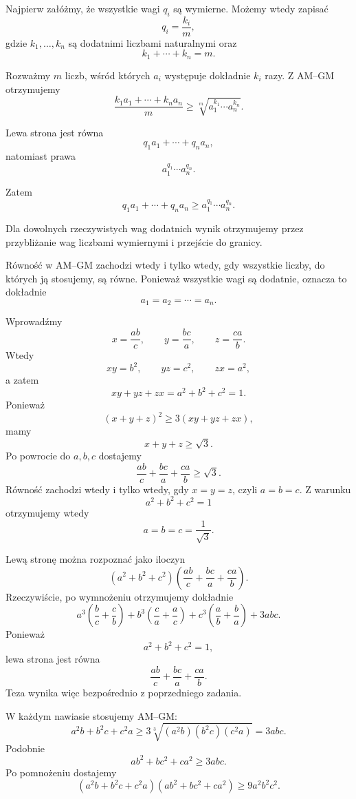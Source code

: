 \documentclass{lecture-kuznia}
\begin{document}
\begin{solution*}[\ref{Z13}]
	Najpierw załóżmy, że wszystkie wagi $q_i$ są wymierne. Możemy wtedy
	zapisać
	\[
		q_i=\frac{k_i}{m},
	\]
	gdzie $k_1,\dots,k_n$ są dodatnimi liczbami naturalnymi oraz
	\[
		k_1+\cdots+k_n=m.
	\]

	Rozważmy $m$ liczb, wśród których $a_i$ występuje dokładnie $k_i$ razy.
	Z AM--GM otrzymujemy
	\[
		\frac{k_1a_1+\cdots+k_na_n}{m}
		\ge
		\sqrt[m]{a_1^{k_1}\cdots a_n^{k_n}}.
	\]

	Lewa strona jest równa
	\[
		q_1a_1+\cdots+q_na_n,
	\]
	natomiast prawa
	\[
		a_1^{q_1}\cdots a_n^{q_n}.
	\]

	Zatem
	\[
		q_1a_1+\cdots+q_na_n
		\ge
		a_1^{q_1}\cdots a_n^{q_n}.
	\]

	Dla dowolnych rzeczywistych wag dodatnich wynik otrzymujemy przez
	przybliżanie wag liczbami wymiernymi i przejście do granicy.

	Równość w AM--GM zachodzi wtedy i tylko wtedy, gdy wszystkie liczby,
	do których ją stosujemy, są równe. Ponieważ wszystkie wagi są dodatnie,
	oznacza to dokładnie
	\[
		a_1=a_2=\cdots=a_n.
	\]
\end{solution*}

\begin{solution*}[\ref{Z14}]
	Wprowadźmy
	\[
		x=\frac{ab}{c},\qquad
		y=\frac{bc}{a},\qquad
		z=\frac{ca}{b}.
	\]
	Wtedy
	\[
		xy=b^2,\qquad yz=c^2,\qquad zx=a^2,
	\]
	a zatem
	\[
		xy+yz+zx=a^2+b^2+c^2=1.
	\]
	Ponieważ
	\[
		(x+y+z)^2\ge3(xy+yz+zx),
	\]
	mamy
	\[
		x+y+z\ge\sqrt3.
	\]
	Po powrocie do $a,b,c$ dostajemy
	\[
		\frac{ab}{c}+\frac{bc}{a}+\frac{ca}{b}\ge\sqrt3.
	\]
	Równość zachodzi wtedy i tylko wtedy, gdy $x=y=z$, czyli $a=b=c$.
	Z warunku
	\[
		a^2+b^2+c^2=1
	\]
	otrzymujemy wtedy
	\[
		a=b=c=\frac1{\sqrt3}.
	\]
\end{solution*}

\begin{solution*}[\ref{Z15}]
	Lewą stronę można rozpoznać jako iloczyn
	\[
		(a^2+b^2+c^2)
		\left(
		\frac{ab}{c}+\frac{bc}{a}+\frac{ca}{b}
		\right).
	\]
	Rzeczywiście, po wymnożeniu otrzymujemy dokładnie
	\[
		a^3\left(\frac bc+\frac cb\right)
		+b^3\left(\frac ca+\frac ac\right)
		+c^3\left(\frac ab+\frac ba\right)
		+3abc.
	\]
	Ponieważ
	\[
		a^2+b^2+c^2=1,
	\]
	lewa strona jest równa
	\[
		\frac{ab}{c}+\frac{bc}{a}+\frac{ca}{b}.
	\]
	Teza wynika więc bezpośrednio z poprzedniego zadania.
\end{solution*}

\begin{solution*}[\ref{Z16}]
	W każdym nawiasie stosujemy AM--GM:
	\[
		a^2b+b^2c+c^2a
		\ge
		3\sqrt[3]{(a^2b)(b^2c)(c^2a)}
		=
		3abc.
	\]
	Podobnie
	\[
		ab^2+bc^2+ca^2
		\ge3abc.
	\]
	Po pomnożeniu dostajemy
	\[
		(a^2b+b^2c+c^2a)(ab^2+bc^2+ca^2)
		\ge9a^2b^2c^2.
	\]
\end{solution*}
\end{document}
